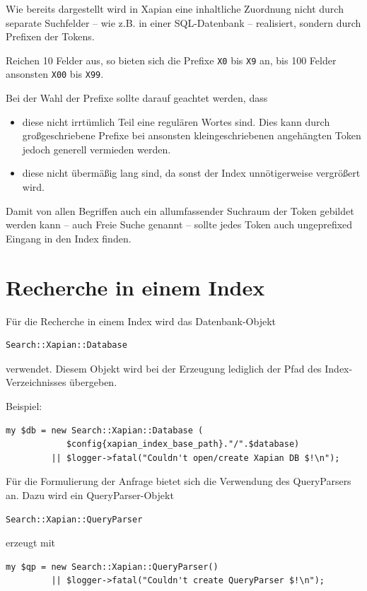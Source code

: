 \documentclass[11pt, twoside, a4paper, BCOR8mm, DIV12, bibtotoc,idxtotoc]{scrbook}
\begin{document}
Wie bereits dargestellt wird in Xapian eine inhaltliche Zuordnung
nicht durch separate Suchfelder -- wie z.B. in einer SQL-Datenbank --
realisiert, sondern durch Prefixen der Tokens.

Reichen 10 Felder aus, so bieten sich die Prefixe \texttt{X0} bis
\texttt{X9} an, bis 100 Felder ansonsten \texttt{X00} bis
\texttt{X99}.

Bei der Wahl der Prefixe sollte darauf geachtet werden, dass

\begin{itemize}
\item diese nicht irrtümlich Teil eine regulären Wortes sind. Dies kann
  durch großgeschriebene Prefixe bei ansonsten kleingeschriebenen
  angehängten Token jedoch generell vermieden werden.
\item diese nicht übermäßig lang sind, da sonst der Index unnötigerweise
  vergrößert wird.
\end{itemize}

Damit von allen Begriffen auch ein allumfassender Suchraum der Token
gebildet werden kann -- auch Freie Suche genannt -- sollte jedes Token
auch ungeprefixed Eingang in den Index finden.

\section{Recherche in einem Index}

Für die Recherche in einem Index wird das Datenbank-Objekt
\begin{verbatim}
Search::Xapian::Database
\end{verbatim}
verwendet. Diesem Objekt wird bei der Erzeugung lediglich der Pfad des
Index-Verzeichnisses übergeben.

Beispiel:

\begin{verbatim}
my $db = new Search::Xapian::Database (
            $config{xapian_index_base_path}."/".$database) 
         || $logger->fatal("Couldn't open/create Xapian DB $!\n");
\end{verbatim}

Für die Formulierung der Anfrage bietet sich die Verwendung des
QueryParsers an. Dazu wird ein QueryParser-Objekt 
\begin{verbatim}
Search::Xapian::QueryParser
\end{verbatim}

erzeugt mit

\begin{verbatim}
my $qp = new Search::Xapian::QueryParser() 
         || $logger->fatal("Couldn't create QueryParser $!\n");
\end{verbatim}
\end{document}
